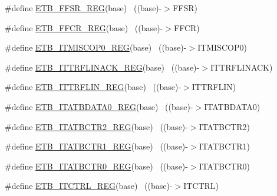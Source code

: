 \begin{DoxyCompactItemize}
\item 
\#define \hyperlink{group___e_t_b___register___accessor___macros_gac5eb4851d221fffa9d22249ba4956057}{E\+T\+B\+\_\+\+F\+F\+S\+R\+\_\+\+R\+EG}(base)                                          ~((base)-\/$>$F\+F\+SR)
\item 
\#define \hyperlink{group___e_t_b___register___accessor___macros_ga5d2408136c4f7c21874acd9f3deaf79e}{E\+T\+B\+\_\+\+F\+F\+C\+R\+\_\+\+R\+EG}(base)                                          ~((base)-\/$>$F\+F\+CR)
\item 
\#define \hyperlink{group___e_t_b___register___accessor___macros_gafe482eb50c100470576834276ef1c897}{E\+T\+B\+\_\+\+I\+T\+M\+I\+S\+C\+O\+P0\+\_\+\+R\+EG}(base)                                ~((base)-\/$>$I\+T\+M\+I\+S\+C\+O\+P0)
\item 
\#define \hyperlink{group___e_t_b___register___accessor___macros_ga7014ba8506cf68b2b1a077f769f05182}{E\+T\+B\+\_\+\+I\+T\+T\+R\+F\+L\+I\+N\+A\+C\+K\+\_\+\+R\+EG}(base)                            ~((base)-\/$>$I\+T\+T\+R\+F\+L\+I\+N\+A\+CK)
\item 
\#define \hyperlink{group___e_t_b___register___accessor___macros_ga65cca5b4e5cbb1449c410c34f2a6b385}{E\+T\+B\+\_\+\+I\+T\+T\+R\+F\+L\+I\+N\+\_\+\+R\+EG}(base)                                  ~((base)-\/$>$I\+T\+T\+R\+F\+L\+IN)
\item 
\#define \hyperlink{group___e_t_b___register___accessor___macros_ga7ecb4f39f8ffa2c06f43631e68743e98}{E\+T\+B\+\_\+\+I\+T\+A\+T\+B\+D\+A\+T\+A0\+\_\+\+R\+EG}(base)                              ~((base)-\/$>$I\+T\+A\+T\+B\+D\+A\+T\+A0)
\item 
\#define \hyperlink{group___e_t_b___register___accessor___macros_gad0d6ffa5e53198bd2fba7005da79f142}{E\+T\+B\+\_\+\+I\+T\+A\+T\+B\+C\+T\+R2\+\_\+\+R\+EG}(base)                                ~((base)-\/$>$I\+T\+A\+T\+B\+C\+T\+R2)
\item 
\#define \hyperlink{group___e_t_b___register___accessor___macros_ga7cd1d5d047d0dac1a92e04f73c945e64}{E\+T\+B\+\_\+\+I\+T\+A\+T\+B\+C\+T\+R1\+\_\+\+R\+EG}(base)                                ~((base)-\/$>$I\+T\+A\+T\+B\+C\+T\+R1)
\item 
\#define \hyperlink{group___e_t_b___register___accessor___macros_ga4e45d90262e36386bdf5f727f2430cb2}{E\+T\+B\+\_\+\+I\+T\+A\+T\+B\+C\+T\+R0\+\_\+\+R\+EG}(base)                                ~((base)-\/$>$I\+T\+A\+T\+B\+C\+T\+R0)
\item 
\#define \hyperlink{group___e_t_b___register___accessor___macros_ga382e78742117de866d4a3cf641ac8ae2}{E\+T\+B\+\_\+\+I\+T\+C\+T\+R\+L\+\_\+\+R\+EG}(base)                                      ~((base)-\/$>$I\+T\+C\+T\+RL)

\end{DoxyCompactItemize}

